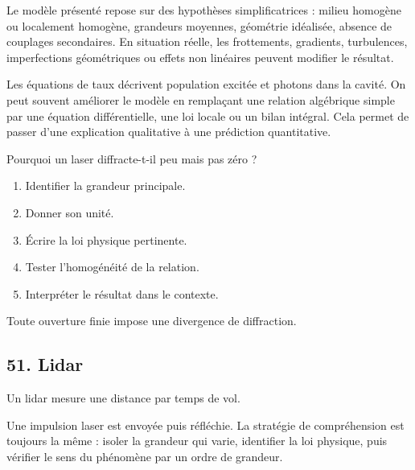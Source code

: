 \documentclass[11pt,a4paper]{article}
\begin{document}
\begin{attentionbox}
Le modèle présenté repose sur des hypothèses simplificatrices : milieu homogène ou localement homogène, grandeurs moyennes, géométrie idéalisée, absence de couplages secondaires. En situation réelle, les frottements, gradients, turbulences, imperfections géométriques ou effets non linéaires peuvent modifier le résultat.
\end{attentionbox}

\begin{approfondissementbox}
Les équations de taux décrivent population excitée et photons dans la cavité.
On peut souvent améliorer le modèle en remplaçant une relation algébrique simple par une équation différentielle, une loi locale ou un bilan intégral. Cela permet de passer d'une explication qualitative à une prédiction quantitative.
\end{approfondissementbox}

\begin{exercicebox}
Pourquoi un laser diffracte-t-il peu mais pas zéro ?
\begin{enumerate}
  \item Identifier la grandeur principale.
  \item Donner son unité.
  \item Écrire la loi physique pertinente.
  \item Tester l'homogénéité de la relation.
  \item Interpréter le résultat dans le contexte.
\end{enumerate}
\end{exercicebox}

\begin{corrigebox}[Indication]
Toute ouverture finie impose une divergence de diffraction.
\end{corrigebox}


\subsection{51. Lidar}

\begin{exemplebox}
Un lidar mesure une distance par temps de vol.
\end{exemplebox}

\begin{methodebox}
Une impulsion laser est envoyée puis réfléchie.
La stratégie de compréhension est toujours la même : isoler la grandeur qui varie, identifier la loi physique, puis vérifier le sens du phénomène par un ordre de grandeur.
\end{methodebox}
\end{document}

